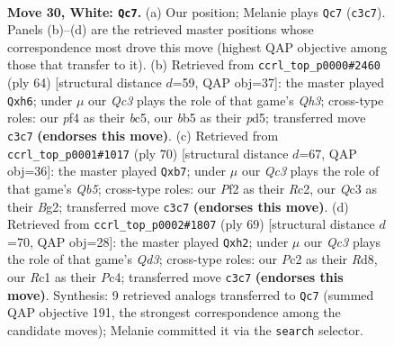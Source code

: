 \documentclass[11pt]{article}
\begin{document}
\clearpage

\begin{figure}[p]\centering
\begin{subfigure}{0.46\textwidth}\centering
\resizebox{\linewidth}{!}{%
\newchessgame
\chessboard[
  setfen={8/3n1k2/r7/pb1Pp3/5pp1/2Q5/PPP2PP1/2R1K3 w - - 0 30},
  showmover=false,
  pgfstyle=straightmove, color=movearrow, markmove={c3-c7}
]}
\caption{}
\end{subfigure}\hfill
\begin{subfigure}{0.46\textwidth}\centering
\resizebox{\linewidth}{!}{%
\newchessgame
\chessboard[
  setfen={6k1/4q3/1rp1p2p/p1bpP3/8/6PQ/P1P4P/5R1K w - - 0 33},
  showmover=false,
  pgfstyle=straightmove, color=movearrow, markmove={h3-h6}
]}
\caption{}
\end{subfigure}
\\[4pt]
\begin{subfigure}{0.46\textwidth}\centering
\resizebox{\linewidth}{!}{%
\newchessgame
\chessboard[
  setfen={3q2r1/1p6/3p2bk/1Q1P1p2/P3pP2/8/2R2PB1/6K1 w - - 1 36},
  showmover=false,
  pgfstyle=straightmove, color=movearrow, markmove={b5-b7}
]}
\caption{}
\end{subfigure}\hfill
\begin{subfigure}{0.46\textwidth}\centering
\resizebox{\linewidth}{!}{%
\newchessgame
\chessboard[
  setfen={3r2k1/5pp1/p2q4/5P2/p1p5/P1P5/KP5P/4QR2 b - - 2 35},
  showmover=false,
  pgfstyle=straightmove, color=movearrow, markmove={d6-h2}
]}
\caption{}
\end{subfigure}
\caption{\textbf{Move 30, White: \texttt{Qc7}.} (a) Our position; Melanie plays \texttt{Qc7} (\texttt{c3c7}). Panels (b)--(d) are the retrieved master positions whose correspondence most drove this move (highest QAP objective among those that transfer to it). (b) Retrieved from \texttt{ccrl\_top\_p0000\#2460} (ply 64) [structural distance $d$=59, QAP obj=37]: the master played \texttt{Qxh6}; under $\mu$ our \emph{Qc3} plays the role of that game's \emph{Qh3}; cross-type roles: our \emph{p}f4 as their \emph{b}c5, our \emph{b}b5 as their \emph{p}d5; transferred move \texttt{c3c7} \textbf{(endorses this move)}. (c) Retrieved from \texttt{ccrl\_top\_p0001\#1017} (ply 70) [structural distance $d$=67, QAP obj=36]: the master played \texttt{Qxb7}; under $\mu$ our \emph{Qc3} plays the role of that game's \emph{Qb5}; cross-type roles: our \emph{P}f2 as their \emph{R}c2, our \emph{Q}c3 as their \emph{B}g2; transferred move \texttt{c3c7} \textbf{(endorses this move)}. (d) Retrieved from \texttt{ccrl\_top\_p0002\#1807} (ply 69) [structural distance $d$=70, QAP obj=28]: the master played \texttt{Qxh2}; under $\mu$ our \emph{Qc3} plays the role of that game's \emph{Qd3}; cross-type roles: our \emph{P}c2 as their \emph{R}d8, our \emph{R}c1 as their \emph{P}c4; transferred move \texttt{c3c7} \textbf{(endorses this move)}. Synthesis: 9 retrieved analogs transferred to \texttt{Qc7} (summed QAP objective 191, the strongest correspondence among the candidate moves); Melanie committed it via the \texttt{search} selector.}
\label{fig:thought-m58}
\end{figure}
\end{document}
